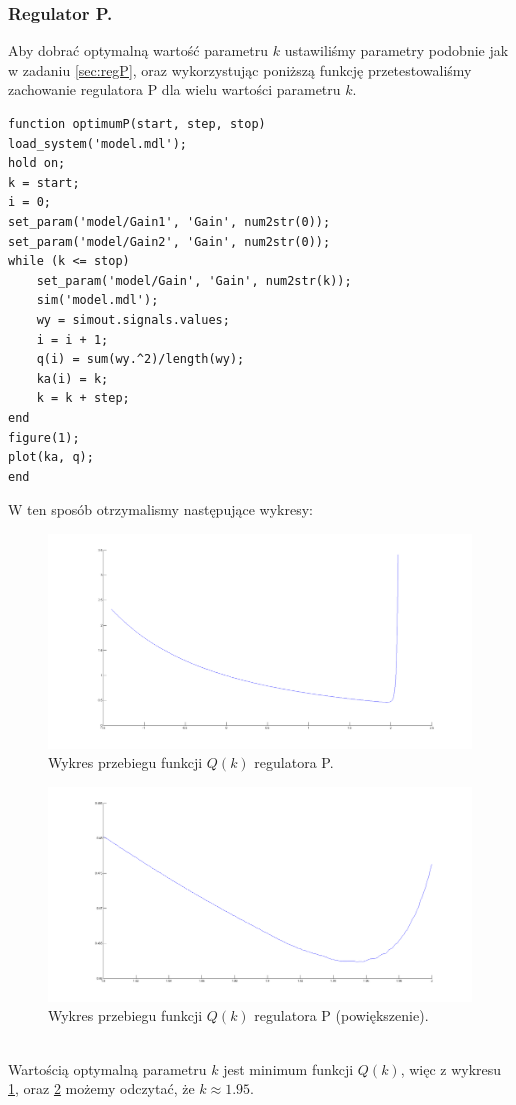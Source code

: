 \documentclass[a4paper,10pt]{article}
\begin{document}
\subsubsection{Regulator P.}\label{sec:optP}
Aby dobrać optymalną wartość parametru $k$ ustawiliśmy parametry podobnie jak w zadaniu \ref{sec:regP}, oraz wykorzystując poniższą funkcję przetestowaliśmy zachowanie regulatora P dla wielu wartości parametru $k$. \\
\newpage \begin{lstlisting}[caption=Funkcja testująca regulator P.]
function optimumP(start, step, stop)
load_system('model.mdl');
hold on;
k = start;
i = 0;
set_param('model/Gain1', 'Gain', num2str(0));
set_param('model/Gain2', 'Gain', num2str(0));
while (k <= stop)
    set_param('model/Gain', 'Gain', num2str(k));
    sim('model.mdl');
    wy = simout.signals.values;
    i = i + 1;
    q(i) = sum(wy.^2)/length(wy);
    ka(i) = k;
    k = k + step;
end
figure(1);
plot(ka, q);
end
\end{lstlisting}
W ten sposób otrzymalismy następujące wykresy: \\
\begin{figure}[!h]
    \centering
	\includegraphics[width=130mm]{CW2-regulatorP-opt1.png}
	\caption{Wykres przebiegu funkcji $Q(k)$ regulatora P.}
    \label{fig:regulatorPopt1}
\end{figure}
\begin{figure}[!h]
    \centering
	\includegraphics[width=130mm]{CW2-regulatorP-opt2.png}
	\caption{Wykres przebiegu funkcji $Q(k)$ regulatora P (powiększenie).}
    \label{fig:regulatorPopt2}
\end{figure}
\\ Wartością optymalną parametru $k$ jest minimum funkcji $Q(k)$, więc z wykresu \ref{fig:regulatorPopt1}, oraz \ref{fig:regulatorPopt2} możemy odczytać, że $k \approx 1.95$.
\end{document}
